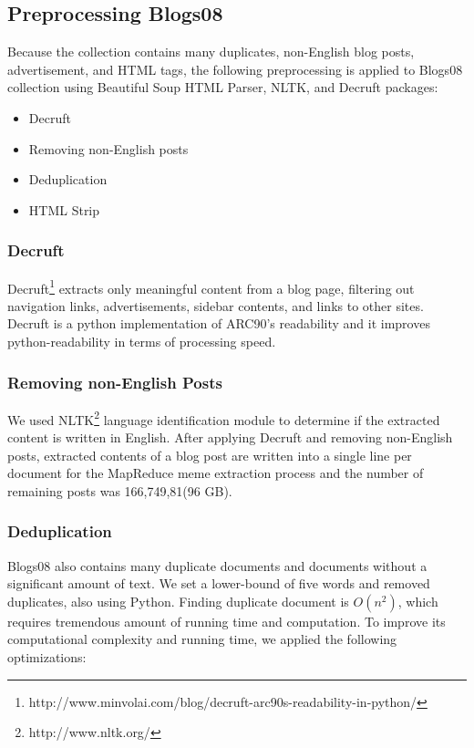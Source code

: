 \documentclass{sig-alternate}
\begin{document}
\subsection{Preprocessing Blogs08}

Because the collection contains many duplicates, non-English blog posts, advertisement, and HTML tags, the following preprocessing is applied to Blogs08 collection using Beautiful Soup HTML Parser, NLTK, and Decruft packages:

\begin{itemize}
\item Decruft
\item Removing non-English posts
\item Deduplication
\item HTML Strip
\end{itemize}


\subsubsection{Decruft}
Decruft\footnote{http://www.minvolai.com/blog/decruft-arc90s-readability-in-python/} extracts only meaningful content from a blog page, filtering out navigation links, advertisements, sidebar contents, and links to other sites. Decruft is a python implementation of ARC90's readability and it improves python-readability in terms of processing speed. 

\subsubsection{Removing non-English Posts}
We used NLTK\footnote{http://www.nltk.org/} language identification module to determine if the extracted content is written in English. After applying Decruft and removing non-English posts, extracted contents of a blog post are written into a single line per document for the MapReduce meme extraction process and the number of remaining posts was 166,749,81(96 GB).

\subsubsection{Deduplication}

Blogs08 also contains many duplicate documents and documents without a significant amount of text. We set a lower-bound of five words and removed duplicates, also using Python. Finding duplicate document is $O(n^2)$, which requires tremendous amount of running time and computation. To improve its computational complexity and running time, we applied the following optimizations:
\end{document}
